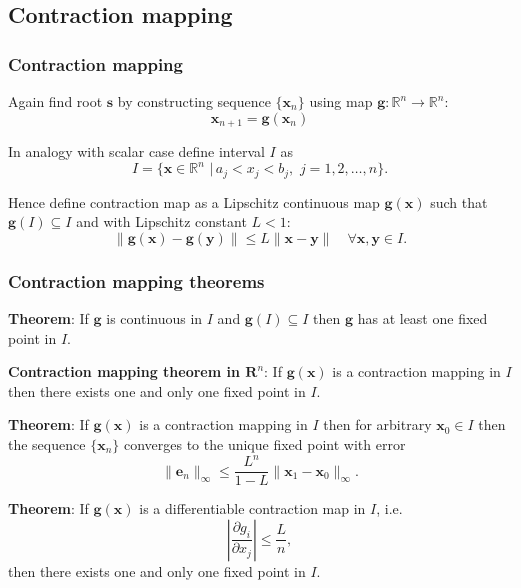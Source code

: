 \documentclass{beamer}
\newcommand{\bfm}[1]{{\boldsymbol{#1}}}
\begin{document}
\subsection{Contraction mapping}

\begin{frame}
  \frametitle{Contraction mapping}

  Again find root $\bfm{s}$ by constructing sequence $\{ \bfm{x}_n \}$
  using map ${\mathbf g}: {\mathbb R}^n \rightarrow {\mathbb R}^n$:
  \begin{equation*}
     \bfm{x}_{n+1} = \bfm{g} (\bfm{x}_n)
  \end{equation*} \pause

  In analogy with scalar case define interval $I$ as
  \begin{equation*}
    I = \{ \bfm{x} \in {\mathbb R}^n \,\, | \, a_j < x_j < b_j, \,\, j
    = 1, 2, \dots, n \}.
  \end{equation*} \pause

  Hence define contraction map as a Lipschitz continuous map
  $\bfm{g}(\bfm{x})$ such that $\bfm{g}(I) \subseteq I$ and with
  Lipschitz constant $L < 1$:
  \begin{equation*}
    \| \bfm{g}(\bfm{x}) - \bfm{g}(\bfm{y}) \| \leq L \| \bfm{x} -
    \bfm{y} \| \quad \forall \bfm{x}, \bfm{y} \in I.
  \end{equation*}

\end{frame}


\begin{frame}
  \frametitle{Contraction mapping theorems}

  {\bf Theorem}: If $\bfm{g}$ is continuous in $I$ and $\bfm{g}(I)
  \subseteq I$ then $\bfm{g}$ has at least one fixed point in $I$.
  \pause

  \vspace{1ex}

  {\bf Contraction mapping theorem in $\mathbf{R}^n$}: If
  $\bfm{g}(\bfm{x})$ is a contraction mapping in $I$ then there exists
  one and only one fixed point in $I$. \pause

  \vspace{1ex}

  {\bf Theorem}: If $\bfm{g}(\bfm{x})$ is a contraction mapping in $I$
  then for arbitrary $\bfm{x}_0 \in I$ then the sequence $\{ \bfm{x}_n
  \}$ converges to the unique fixed point with error
  \begin{equation*}
    \| \bfm{e}_n \|_{\infty} \leq \frac{L^n}{1 - L} \| \bfm{x}_1 -
    \bfm{x}_0 \|_{\infty}.
  \end{equation*} \pause

  {\bf Theorem}: If $\bfm{g}(\bfm{x})$ is a differentiable contraction
  map in $I$, i.e.\
  \begin{equation*}
    \left| \frac{\partial g_i}{\partial x_j} \right| \leq \frac{L}{n},
  \end{equation*}
  then there exists one and only one fixed point in $I$.

\end{frame}
\end{document}
